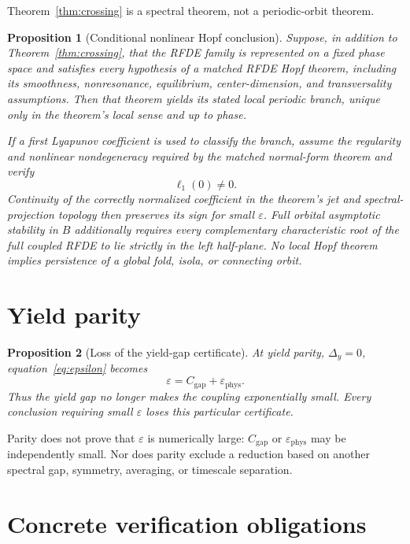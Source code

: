 \documentclass[11pt]{article}
\newtheorem{proposition}{Proposition}
\theoremstyle{definition}
\theoremstyle{remark}
\begin{document}
Theorem~\ref{thm:crossing} is a spectral theorem, not a periodic-orbit theorem.

\begin{proposition}[Conditional nonlinear Hopf conclusion]
\label{prop:hopf}
Suppose, in addition to Theorem~\ref{thm:crossing}, that the RFDE family is represented on a fixed phase space and satisfies every hypothesis of a matched RFDE Hopf theorem, including its smoothness, nonresonance, equilibrium, center-dimension, and transversality assumptions. Then that theorem yields its stated local periodic branch, unique only in the theorem's local sense and up to phase.

If a first Lyapunov coefficient is used to classify the branch, assume the regularity and nonlinear nondegeneracy required by the matched normal-form theorem and verify
\[
\ell_1(0)\ne0.
\]
Continuity of the correctly normalized coefficient in the theorem's jet and spectral-projection topology then preserves its sign for small $\varepsilon$. Full orbital asymptotic stability in $B$ additionally requires every complementary characteristic root of the full coupled RFDE to lie strictly in the left half-plane. No local Hopf theorem implies persistence of a global fold, isola, or connecting orbit.
\end{proposition}

\section{Yield parity}
\label{sec:parity}

\begin{proposition}[Loss of the yield-gap certificate]
\label{prop:parity}
At yield parity, $\Delta_y=0$, equation~\eqref{eq:epsilon} becomes
\[
\varepsilon=C_{\mathrm{gap}}+\varepsilon_{\mathrm{phys}}.
\]
Thus the yield gap no longer makes the coupling exponentially small. Every conclusion requiring small $\varepsilon$ loses this particular certificate.
\end{proposition}

Parity does not prove that $\varepsilon$ is numerically large: $C_{\mathrm{gap}}$ or $\varepsilon_{\mathrm{phys}}$ may be independently small. Nor does parity exclude a reduction based on another spectral gap, symmetry, averaging, or timescale separation.

\section{Concrete verification obligations}
\label{sec:checklist}
\end{document}
